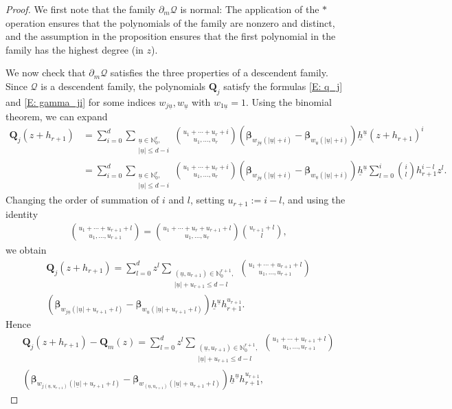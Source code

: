 \documentclass[11pt]{amsart}
\theoremstyle{definition}
\newcommand{\N}{{\mathbb N}}
\newcommand{\CQ}{{\mathcal Q}}
\newcommand{\bq}{{\textbf{Q}}}
\newcommand{\bbeta}{{\boldsymbol{\beta}}}
\newcommand{\uh}{{\underline{h}}}
\newcommand{\uu}{{\underline{u}}}
\begin{document}
    \begin{proof}
        We first note that the family $\partial_m\CQ$ is normal: The application of the $*$ operation ensures that the polynomials of the family are nonzero and distinct, and the assumption in the proposition ensures that the first polynomial in the family has the highest degree (in $z$).

        We now check that $\partial_m\CQ$ satisfies the three properties of a descendent family.
        Since $\CQ$ is a descendent family, the polynomials $\bq_j$ satisfy the formulas \eqref{E: q_j} and \eqref{E: gamma_ji} for some indices $w_{j\uu}, w_\uu$ with $w_{1\uu}=1$.
        Using the binomial theorem, we can expand
        \begin{align*}
            \bq_j(z+h_{r+1}) &= \sum_{i=0}^d \sum_{\substack{\uu\in \N_0^r,\\ |\uu|\leq d-i}} {{{u_1+\cdots + u_r+i}\choose{u_1, \ldots, u_r}}}(\bbeta_{w_{j\uu}(|\uu|+i)}-\bbeta_{w_{\uu}(|\uu|+i)})\uh^\uu (z+h_{r+1})^i\\
            &=\sum_{i=0}^d \sum_{\substack{\uu\in \N_0^r,\\ |\uu|\leq d-i}} {{{u_1+\cdots + u_r+i}\choose{u_1, \ldots, u_r}}}(\bbeta_{w_{j\uu}(|\uu|+i)}-\bbeta_{w_{\uu}(|\uu|+i)})\uh^\uu \sum_{l=0}^i{{{i}\choose{l}}}h_{r+1}^{i-l}z^l.
        \end{align*}
        Changing the order of summation of $i$ and $l$,  setting $u_{r+1} := i-l$, and using the identity
        \begin{align*}
            {{{u_1+\cdots +u_{r+1}+l}\choose{u_1, \ldots, u_{r+1}}}} = {{{u_1+\cdots + u_r+u_{r+1}+l}\choose{u_1, \ldots, u_r}}}{{{u_{r+1}+l}\choose{l}}},
        \end{align*}
        we obtain
        \begin{multline*}
            \bq_j(z+h_{r+1}) = \sum_{l=0}^d z^l \sum_{\substack{(\uu, u_{r+1})\in \N_0^{r+1},\\ |\uu|+u_{r+1}\leq d-l}} {{{u_1+\cdots + u_{r+1}+l}\choose{u_1, \ldots, u_{r+1}}}}\\ (\bbeta_{w_{j\uu}(|\uu|+u_{r+1}+l)}-\bbeta_{w_{\uu}(|\uu|+u_{r+1}+l)})\uh^\uu h_{r+1}^{u_{r+1}}.
        \end{multline*}
        Hence 
        \begin{multline}\label{E: q_j - q_m}
             \bq_j(z+h_{r+1})-\bq_m(z) = \sum_{l=0}^d z^l \sum_{\substack{(\uu, u_{r+1})\in \N_0^{r+1},\\ |\uu|+u_{r+1}\leq d-l}} {{{u_1+\cdots + u_{r+1}+l}\choose{u_1, \ldots, u_{r+1}}}}\\ (\bbeta_{w_{j(\uu, u_{r+1})}(|\uu|+u_{r+1}+l)}-\bbeta_{w_{(\uu, u_{r+1})}(|\uu|+u_{r+1}+l)})\uh^\uu h_{r+1}^{u_{r+1}},

\end{multline}
\end{proof}
\end{document}
